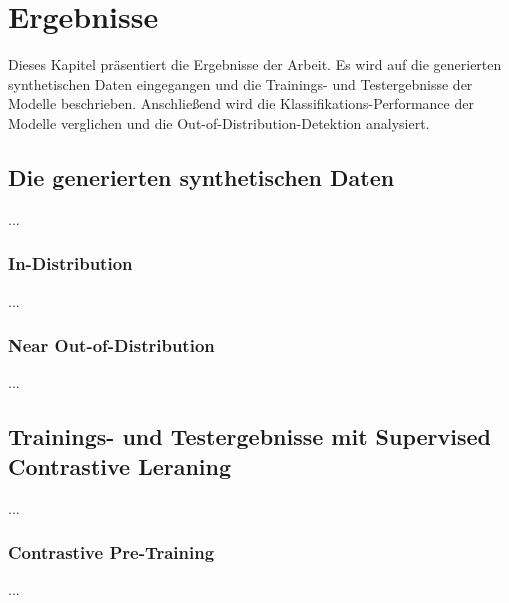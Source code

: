 \chapter{Ergebnisse}

Dieses Kapitel präsentiert die Ergebnisse der Arbeit. Es wird auf die generierten synthetischen Daten eingegangen und die Trainings- und Testergebnisse der Modelle beschrieben. Anschließend wird die Klassifikations-Performance der Modelle verglichen und die Out-of-Distribution-Detektion analysiert.

\section{Die generierten synthetischen Daten}

...

\subsection{In-Distribution}

...

\subsection{Near Out-of-Distribution}

...

\section{Trainings- und Testergebnisse mit Supervised Contrastive Leraning}

...

\subsection{Contrastive Pre-Training}

...

